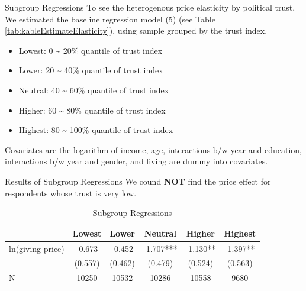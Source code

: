 \documentclass[
  ignorenonframetext,
]{beamer}
\providecommand{\tightlist}{%
  \setlength{\itemsep}{0pt}\setlength{\parskip}{0pt}}
\begin{document}
\begin{frame}{Subgroup Regressions}
\protect\hypertarget{subgroup-regressions}{}
To see the heterogenous price elasticity by political trust,
We estimated the baseline regression model (5) (see Table \ref{tab:kableEstimateElasticity}),
using sample grouped by the trust index.

\begin{itemize}
\tightlist
\item
  Lowest: 0 \textasciitilde{} 20\% quantile of trust index
\item
  Lower: 20 \textasciitilde{} 40\% quantile of trust index
\item
  Neutral: 40 \textasciitilde{} 60\% quantile of trust index
\item
  Higher: 60 \textasciitilde{} 80\% quantile of trust index
\item
  Highest: 80 \textasciitilde{} 100\% quantile of trust index
\end{itemize}

Covariates are the logarithm of income, age, interactions b/w year and education,
interactions b/w year and gender, and living are dummy into covariates.
\end{frame}

\begin{frame}{Results of Subgroup Regressions}
\protect\hypertarget{results-of-subgroup-regressions}{}
We cound \textbf{NOT} find the price effect for respondents whose trust is very low.

\begin{table}

\caption{\label{tab:kableEstimateElasticityByTrustGroup}Subgroup Regressions}
\centering
\fontsize{9}{11}\selectfont
\begin{tabular}[t]{lccccc}
\toprule
 & Lowest & Lower & Neutral & Higher & Highest\\
\midrule
ln(giving price) & -0.673 & -0.452 & -1.707*** & -1.130** & -1.397**\\
 & (0.557) & (0.462) & (0.479) & (0.524) & (0.563)\\
N & 10250 & 10532 & 10286 & 10558 & 9680\\
\bottomrule
\end{tabular}
\end{table}
\end{frame}
\end{document}
